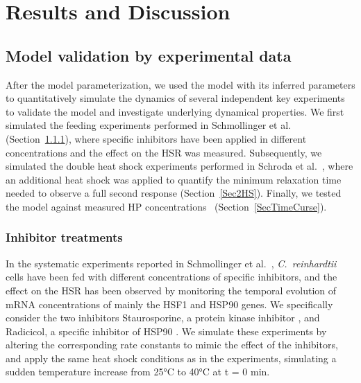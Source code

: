\documentclass[oneside, 10pt, a4paper, twocolumn]{article}
\begin{document}
\section{Results and Discussion}

\subsection{Model validation by experimental data}
\label{SectionExperiments}

After the model parameterization, we used the model with its inferred parameters to quantitatively simulate the dynamics of several independent key experiments to validate the model and investigate underlying dynamical properties. 
We first  simulated the feeding experiments performed in Schmollinger et al. \cite{Schmollinger2013} (Section~\ref{SecFeeding}),
where specific inhibitors have been applied in different concentrations and the
effect on the HSR was measured. Subsequently, we simulated the double heat shock experiments performed
in Schroda et al.~\cite{Schroda2000}, where an additional heat shock was applied 
to quantify the minimum relaxation time needed to observe a full second response (Section~\ref{Sec2HS}). Finally, we tested the model against measured HP concentrations~\cite{Muehlhaus2011} (Section~\ref{SecTimeCurse}).

\subsubsection{Inhibitor treatments}
\label{SecFeeding}

In the systematic experiments reported in Schmollinger et al.~\cite{Schmollinger2013}, \textit{C.~reinhardtii} cells have been fed
with different concentrations of specific inhibitors, and the effect on the HSR
has been observed by monitoring the temporal evolution of mRNA concentrations
of mainly the HSF1 and HSP90 genes.
We specifically consider the two inhibitors Staurosporine, a protein kinase inhibitor \cite{Karaman2008}, 
and Radicicol, a specific inhibitor of HSP90 \cite{Roe1999}. 
We simulate these experiments by altering the corresponding rate constants to mimic the effect of 
the inhibitors, and apply the same heat shock conditions as in the experiments,
simulating a sudden temperature increase from 25°C to 40°C at t = 0 min.
\end{document}
